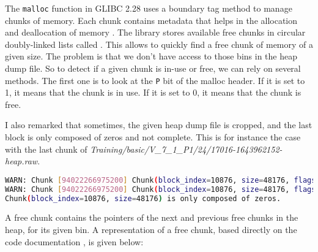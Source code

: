     The \texttt{malloc} function in GLIBC 2.28 uses a boundary tag method to manage chunks of memory. Each chunk contains metadata that helps in the allocation and deallocation of memory \cite{MallocGLIBC2001} \cite{MallocInternalsWiki2023}. The library stores available free chunks in circular doubly-linked lists called . This allows to quickly find a free chunk of memory of a given size. The problem is that we don't have access to those bins in the heap dump file. So to detect if a given chunk is in-use or free, we can rely on several methods. The first one is to look at the \texttt{P} bit of the malloc header. If it is set to 1, it means that the chunk is in use. If it is set to 0, it means that the chunk is free. 

    I also remarked that sometimes, the given heap dump file is cropped, and the last block is only composed of zeros and not complete. This is for instance the case with the last chunk of \textit{Training/basic/V\_7\_1\_P1/24/17016-1643962152-heap.raw}.

\begin{lstlisting}[language=bash, caption={Logs from chunk exploration script, related to the last chunk of the file \textit{Training/basic/V\_7\_1\_P1/24/17016-1643962152-heap.raw}. }]
WARN: Chunk [94022266975200] Chunk(block_index=10876, size=48176, flags=[A=False, M=False, P=True]) is out of bounds. Last block index: 16895 Iteration index: 16896 
WARN: Chunk [94022266975200] Chunk(block_index=10876, size=48176, flags=[A=False, M=False, P=True]) is out of bounds. Last block index: 16895 Iteration index: 16897
Chunk(block_index=10876, size=48176) is only composed of zeros.
\end{lstlisting}

    A free chunk contains the pointers of the next and previous free chunks in the heap, for its given bin. A representation of a free chunk, based directly on the code documentation \cite{MallocGLIBC2001}, is given below:


